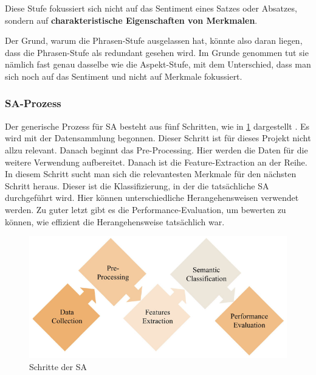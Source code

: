 Diese Stufe fokussiert sich nicht auf das Sentiment eines Satzes oder Absatzes, sondern auf \textbf{charakteristische Eigenschaften von Merkmalen}.

Der Grund, warum \cite{amjad2023sentiment} die Phrasen-Stufe ausgelassen hat, könnte also daran liegen, dass die Phrasen-Stufe als redundant gesehen wird. Im Grunde genommen tut sie nämlich fast genau dasselbe wie die Aspekt-Stufe, mit dem Unterschied, dass man sich noch auf das Sentiment und nicht auf Merkmale fokussiert.

\subsubsection{SA-Prozess}

Der generische Prozess für SA besteht aus fünf Schritten, wie in \ref{fig:sa-process} dargestellt \cite[21572]{amjad2023sentiment}. Es wird mit der Datensammlung begonnen. Dieser Schritt ist für dieses Projekt nicht allzu relevant. Danach beginnt das Pre-Processing. Hier werden die Daten für die weitere Verwendung aufbereitet. Danach ist die Feature-Extraction an der Reihe. In diesem Schritt sucht man sich die relevantesten Merkmale für den nächsten Schritt heraus. Dieser ist die Klassifizierung, in der die tatsächliche SA durchgeführt wird. Hier können unterschiedliche Herangehensweisen verwendet werden. Zu guter letzt gibt es die Performance-Evaluation, um bewerten zu können, wie effizient die Herangehensweise tatsächlich war.

\begin{figure}
    \centering
    \includegraphics[scale=0.43]{images/dlengsteiner/sentimentanalasys_process.png}
    \caption{Schritte der SA}
    \label{fig:sa-process}
\end{figure}
